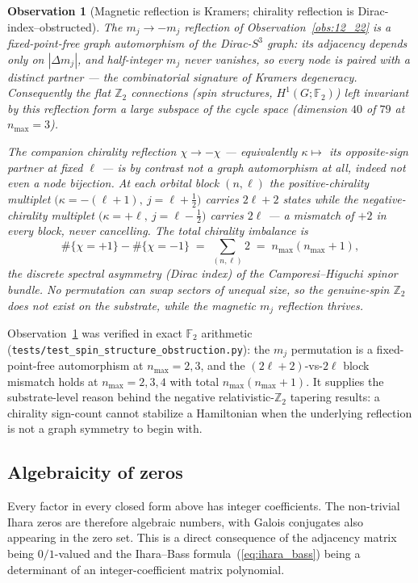\documentclass[11pt]{article}
\newtheorem{observation}{Observation}
\begin{document}
\begin{observation}[Magnetic reflection is Kramers; chirality reflection is Dirac-index--obstructed]
\label{obs:chirality_obstruction}
The $m_j\to-m_j$ reflection of Observation~\ref{obs:12_22} is a
\emph{fixed-point-free graph automorphism} of the Dirac-$S^3$ graph:
its adjacency depends only on $|\Delta m_j|$, and half-integer $m_j$
never vanishes, so every node is paired with a distinct partner --- the
combinatorial signature of Kramers degeneracy.  Consequently the flat
$\mathbb{Z}_2$ connections (spin structures, $H^1(G;\mathbb{F}_2)$)
left invariant by this reflection form a large subspace of the cycle
space (dimension $40$ of $79$ at $n_{\max}=3$).

The companion \emph{chirality} reflection $\chi\to-\chi$ --- equivalently
$\kappa\mapsto$ its opposite-sign partner at fixed $\ell$ --- is by
contrast not a graph automorphism at all, indeed not even a node
bijection.  At each orbital block $(n,\ell)$ the positive-chirality
multiplet $\bigl(\kappa=-(\ell+1),\ j=\ell+\tfrac12\bigr)$ carries
$2\ell+2$ states while the negative-chirality multiplet
$\bigl(\kappa=+\ell,\ j=\ell-\tfrac12\bigr)$ carries $2\ell$ --- a
mismatch of $+2$ in \emph{every} block, never cancelling.  The total
chirality imbalance is
\[
  \#\{\chi=+1\}-\#\{\chi=-1\}
  \;=\;\sum_{(n,\ell)} 2 \;=\; n_{\max}(n_{\max}+1),
\]
the discrete spectral asymmetry (Dirac index) of the
Camporesi--Higuchi spinor bundle.  No permutation can swap sectors of
unequal size, so the genuine-spin $\mathbb{Z}_2$ does not exist on the
substrate, while the magnetic $m_j$ reflection thrives.
\end{observation}

Observation~\ref{obs:chirality_obstruction} was verified in exact
$\mathbb{F}_2$ arithmetic
(\texttt{tests/test\_spin\_structure\_obstruction.py}): the $m_j$ permutation
is a fixed-point-free automorphism at $n_{\max}=2,3$, and the
$(2\ell+2)$-vs-$2\ell$ block mismatch holds at $n_{\max}=2,3,4$ with
total $n_{\max}(n_{\max}+1)$.  It supplies the substrate-level reason
behind the negative relativistic-$\mathbb{Z}_2$ tapering results: a chirality
sign-count cannot stabilize a Hamiltonian when the underlying
reflection is not a graph symmetry to begin with.

\subsection{Algebraicity of zeros}

Every factor in every closed form above has integer coefficients.
The non-trivial Ihara zeros are therefore algebraic numbers, with
Galois conjugates also appearing in the zero set.  This is a direct
consequence of the adjacency matrix being $0/1$-valued and the
Ihara--Bass formula~(\ref{eq:ihara_bass}) being a determinant of an
integer-coefficient matrix polynomial.
\end{document}
